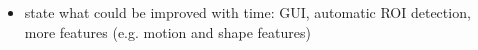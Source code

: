 \begin{itemize}
    \item state what could be improved with time: GUI, automatic ROI detection, more features (e.g. motion and shape features)
\end{itemize}
